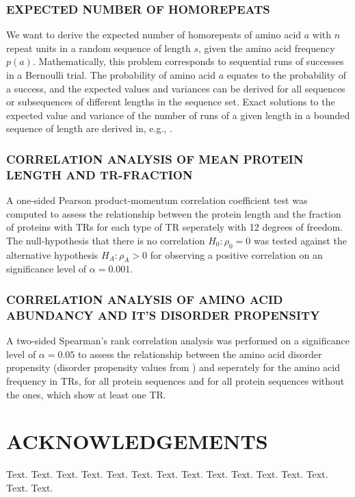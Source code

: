 \documentclass[a4,center,fleqn]{NAR}
\begin{document}
\subsubsection{\MakeUppercase{Expected number of homorepeats}}
We want to derive the expected number of homorepeats of amino acid $a$ with $n$ repeat units in a random sequence of length $s$, given the amino acid frequency $p(a)$. Mathematically, this problem corresponds to sequential runs of successes in a Bernoulli trial. The probability of amino acid $a$ equates to the probability of a success, and the expected values and variances can be derived for all sequences or subsequences of different lengths in the sequence set. Exact solutions to the expected value and variance of the number of runs of a given length in a bounded sequence
of length are derived in, e.g., \cite{Makri2011}.

\subsubsection{\MakeUppercase{Correlation Analysis of Mean Protein Length and TR-fraction}}
A one-sided Pearson product-momentum correlation coefficient test was computed to assess the relationship between the protein length and the fraction of proteins with TRs for each type of TR seperately with 12 degrees of freedom. The null-hypothesis that there is no correlation $H_{0}: \rho_{0} = 0$ was tested against the alternative hypothesis $H_{A}: \rho_{A} > 0$ for observing a positive correlation on an significance level of $\alpha = 0.001$.

\subsubsection{\MakeUppercase{Correlation Analysis of Amino Acid Abundancy and it's Disorder Propensity}}
A two-sided Spearman's rank correlation analysis was performed on a significance level of $\alpha = 0.05$ to assess the relationship between the amino acid disorder propensity (disorder propensity values from \cite{Uversky2013}) and seperately for the amino acid frequency in TRs, for all protein sequences and for all protein sequences without the ones, which show at least one TR.


\section{ACKNOWLEDGEMENTS}

Text. Text. Text. Text. Text. Text. Text. Text. Text. Text. Text.
Text. Text. Text. Text.
\end{document}
